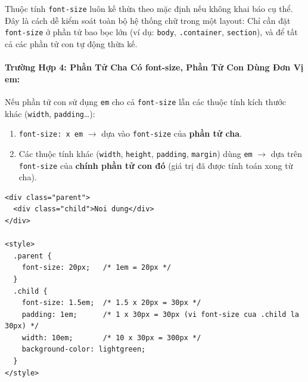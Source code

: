\documentclass[11pt,oneside]{book}
\newcommand{\thd}[1]{\textcolor{white}{\textbf{\strut #1}}}
\newcommand{\codeinline}[1]{\textcolor{accentOrange}{\texttt{#1}}}
\begin{document}
\begin{prettyTableBox}
\sffamily\small
{}
\end{prettyTableBox}

\begin{tipBox}
Thuộc tính \codeinline{font-size} luôn kế thừa theo mặc định nếu không khai báo cụ thể. Đây là cách dễ kiểm soát toàn bộ hệ thống chữ trong một layout: Chỉ cần đặt \codeinline{font-size} ở phần tử bao bọc lớn (ví dụ: \codeinline{body}, \codeinline{.container}, \codeinline{section}), và để tất cả các phần tử con tự động thừa kế.
\end{tipBox}

\paragraph{Trường Hợp 4: Phần Tử Cha Có font-size, Phần Tử Con Dùng Đơn Vị em:}
Nếu phần tử con sử dụng \codeinline{em} cho cả \codeinline{font-size} lẫn các thuộc tính kích thước khác (\codeinline{width}, \codeinline{padding}\dots):
\begin{enumerate}[leftmargin=1.5em, itemsep=2pt, parsep=0pt]
    \item \codeinline{font-size: x em} $\rightarrow$ dựa vào \codeinline{font-size} của \textbf{phần tử cha}.
    \item Các thuộc tính khác (\codeinline{width}, \codeinline{height}, \codeinline{padding}, \codeinline{margin}) dùng \codeinline{em} $\rightarrow$ dựa trên \codeinline{font-size} của \textbf{chính phần tử con đó} (giá trị đã được tính toán xong từ cha).
\end{enumerate}

\begin{codeWindow}
\begin{lstlisting}[language=HTML5]
<div class="parent">
  <div class="child">Noi dung</div>
</div>

<style>
  .parent {
    font-size: 20px;   /* 1em = 20px */
  }
  .child {
    font-size: 1.5em;  /* 1.5 x 20px = 30px */
    padding: 1em;      /* 1 x 30px = 30px (vi font-size cua .child la 30px) */
    width: 10em;       /* 10 x 30px = 300px */
    background-color: lightgreen;
  }
</style>
\end{lstlisting}
\end{codeWindow}
\end{document}
